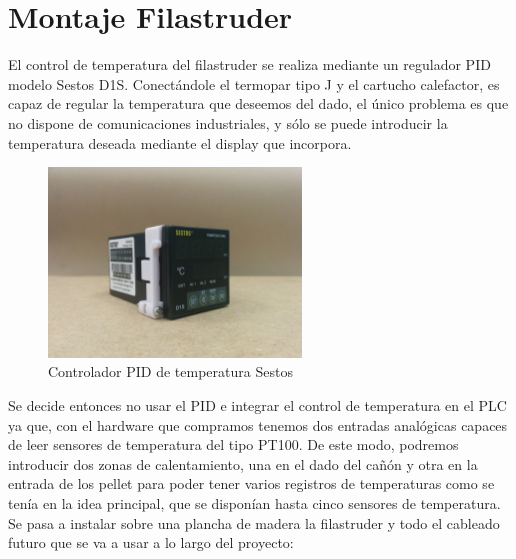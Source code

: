 \chapter{Montaje Filastruder}
\label{ane:filastruder}

El control de temperatura del filastruder se realiza mediante un regulador PID modelo Sestos D1S. Conectándole el termopar tipo J y el cartucho calefactor, es capaz de regular la temperatura que deseemos del dado, el único problema es que no dispone de comunicaciones industriales, y sólo se puede introducir la temperatura deseada mediante el display que incorpora.
   	\begin{figure}[H]
            \centering
            \includegraphics[width=0.6\textwidth]{images/filaextruder/IMG_20150814_123957.jpg}
            \caption{Controlador PID de temperatura Sestos}
            \label{fig:hardware_sestos}
    \end{figure}

Se decide entonces no usar el PID e integrar el control de temperatura en el PLC ya que, con el hardware que compramos tenemos dos entradas analógicas capaces de leer sensores de temperatura del tipo PT100. De este modo, podremos introducir dos zonas de calentamiento, una en el dado del cañón y otra en la entrada de los pellet para poder tener varios registros de temperaturas como se tenía en la idea principal, que se disponían hasta cinco sensores de temperatura.\\

Se pasa a instalar sobre una plancha de madera la filastruder y todo el cableado futuro que se va a usar a lo largo del proyecto:\\

